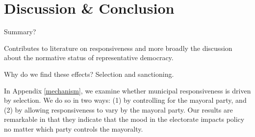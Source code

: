 \documentclass[a4paper,12pt]{article}
\begin{document}
\section*{Discussion \& Conclusion}


Summary?

Contributes to literature on responsiveness and more broadly the discussion about the normative status of representative democracy.

Why do we find these effects? Selection and sanctioning.


In Appendix \ref{mechanism}, we examine whether municipal responsiveness is driven by selection. We do so in two ways: (1) by controlling for the mayoral party, and (2) by allowing responsiveness to vary by the mayoral party. Our results are remarkable in that they indicate that the mood in the electorate impacts policy no matter which party controls the mayoralty.



\onehalfspacing



\clearpage

\renewcommand{\thesubsection}{\Alph{subsection}}
\renewcommand{\thetable}{\Alph{subsection}\arabic{table}}
\renewcommand{\thefigure}{\Alph{subsection}\arabic{figure}}
\end{document}
